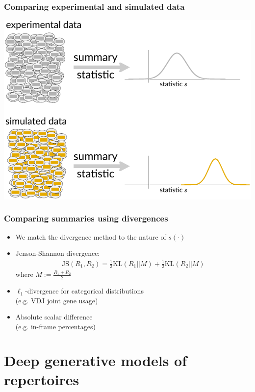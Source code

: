 \documentclass[mathserif,compress]{beamer}
\newcommand*\ba{\[ \begin{aligned}}
\newcommand*\ea{\end{aligned} \]}
\renewcommand\;{\,}
\begin{document}
\begin{frame}\frametitle{Comparing experimental and simulated data}
\begin{center}
\includegraphics[width=\linewidth]{Images/summary-stats.pdf}
\end{center}
\end{frame}

\begin{frame}\frametitle{Comparing summaries using divergences}
\begin{itemize}
\item
We match the divergence method to the nature of $s(\cdot)$
\bigskip
\item
Jenson-Shannon divergence:
\ba
\text{JS}(R_1, R_2) = \frac{1}{2} \text{KL}(R_1 || M) + \frac{1}{2} \text{KL}(R_2 || M)
\ea
where $M := \frac{R_1 + R_2}{2}$

\bigskip
\item
$\ell_1$-divergence for categorical distributions
\\ \vspace{0.5em}
(e.g. VDJ joint gene usage)
\bigskip
\item
Absolute scalar difference \\
(e.g. in-frame percentages)
\end{itemize}
\end{frame}

\section{Deep generative models of repertoires}
\end{document}
